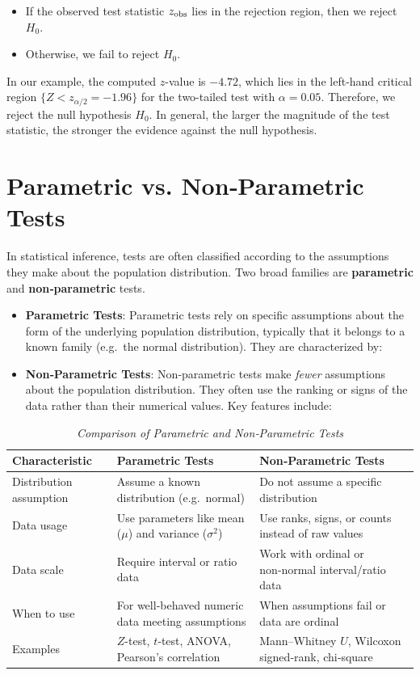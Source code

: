 \documentclass[twoside]{book}
\begin{document}
\begin{itemize}
	\item If the observed test statistic \(z_{\rm obs}\) lies in the rejection region, then we reject \(H_0\).
	\item Otherwise, we fail to reject \(H_0\).
\end{itemize}

In our example, the computed \(z\)-value is \(-4.72\), which lies in the left‐hand critical region \(\{Z < z_{\alpha/2} = -1.96\}\) for the two-tailed test with $\alpha = 0.05$. Therefore, we reject the null hypothesis \(H_0\). In general, the larger the magnitude of the test statistic, the stronger the evidence against the null hypothesis.

\section{Parametric vs. Non‑Parametric Tests}

In statistical inference, tests are often classified according to the assumptions they make about the population distribution.  Two broad families are \textbf{parametric} and \textbf{non‑parametric} tests.
\begin{itemize}
\item \textbf{Parametric Tests}:
Parametric tests rely on specific assumptions about the form of the underlying population distribution, typically that it belongs to a known family (e.g.\ the normal distribution).  They are characterized by:


\item \textbf{Non‑Parametric Tests}:
Non‑parametric tests make \emph{fewer} assumptions about the population distribution.  They often use the ranking or signs of the data rather than their numerical values.  Key features include:
\end{itemize}

\begin{table}[H]
\centering
\begin{tabular}{p{2cm}|p{5cm}|p{5cm}}
\toprule
\textbf{Characteristic} & \textbf{Parametric Tests} & \textbf{Non‑Parametric Tests} \\
\midrule
Distribution assumption
  & Assume a known distribution (e.g.\ normal)
  & Do not assume a specific distribution \\
\midrule
Data usage
  & Use parameters like mean ($\mu$) and variance ($\sigma^2$)
  & Use ranks, signs, or counts instead of raw values \\
\midrule
Data scale
  & Require interval or ratio data
  & Work with ordinal or non‑normal interval/ratio data \\
\midrule
When to use
  & For well‑behaved numeric data meeting assumptions
  & When assumptions fail or data are ordinal \\
\midrule
Examples
  & $Z$-test, $t$‑test, ANOVA, Pearson’s correlation
  & Mann–Whitney $U$, Wilcoxon signed‑rank, chi‑square \\
\bottomrule
\end{tabular}
\caption{\textit{Comparison of Parametric and Non‑Parametric Tests}}
\end{table}
\end{document}

